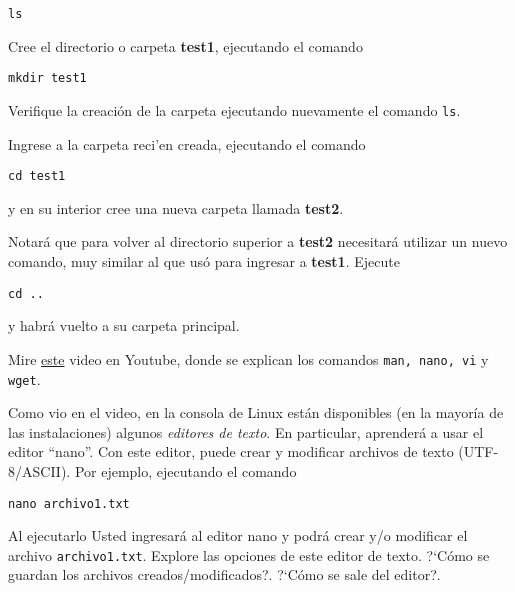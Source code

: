 \documentclass[11pt]{exam}
\begin{document}
\begin{questions}
\begin{parts}
\begin{verbatim}
ls
\end{verbatim}

\item Cree el directorio o carpeta \textbf{test1}, ejecutando el comando 

\begin{verbatim}
mkdir test1
\end{verbatim}

Verifique la creación de la carpeta ejecutando nuevamente el comando \texttt{ls}.

\item Ingrese a la carpeta reci'en creada, ejecutando el comando 

\begin{verbatim}
cd test1
\end{verbatim}

y en su interior cree una nueva carpeta llamada \textbf{test2}.

\item Notará que para volver al directorio superior a \textbf{test2} necesitará utilizar un nuevo comando, muy similar al que usó para ingresar a \textbf{test1}. Ejecute

\begin{verbatim}
cd ..
\end{verbatim}

y habrá vuelto a su carpeta principal.

\item Mire \href{https://www.youtube.com/watch?v=4Cz8E71PYd4}{este} video en Youtube, donde se explican los comandos \texttt{man, nano, vi} y \texttt{wget}.

\item Como vio en el video, en la consola de Linux están disponibles (en la mayoría de las instalaciones) algunos \textit{editores de texto}. En particular, aprenderá a usar el editor ``nano''. Con este editor, puede crear y modificar archivos de texto (UTF-8/ASCII). Por ejemplo, ejecutando el comando 

\begin{verbatim}
nano archivo1.txt
\end{verbatim}

Al ejecutarlo Usted ingresará al editor nano y podrá crear y/o modificar el archivo \texttt{archivo1.txt}.
 Explore las opciones de este editor de texto. ?`Cómo se guardan los archivos creados/modi\-fi\-ca\-dos?. ?`Cómo se sale del editor?.


\end{parts}
\end{questions}
\end{document}
